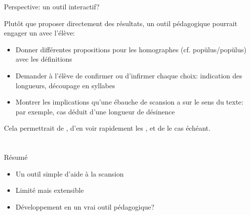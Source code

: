 \documentclass{beamer}
\newcommand\overtxt[2]{\makebox[0cm][l]{\color{diacrit}#1}#2}
\newcommand\hlbr{\overtxt{\u~}}
\newcommand\hllg{\overtxt{\=~}}
\begin{document}
\begin{frame}{Perspective: un outil interactif?}

Plutôt que proposer directement des résultats, un outil pédagogique pourrait engager un  avec l'élève:

\begin{itemize}
\item Donner différentes propositions pour les homographes (cf. p\hlbr{o}p\u{u}lus/p\hllg{o}p\u{u}lus) avec les définitions

\item Demander à l'élève de confirmer ou d'infirmer chaque choix: indication des longueurs, découpage en syllabes

\item Montrer les implications qu'une ébauche de scansion a sur le sens du texte:\\ par exemple, cas déduit d'une longueur de désinence

\end{itemize}

\vfill

Cela permettrait de , d'en voir rapidement les , et de  le cas échéant.

\end{frame} %



\section*{}

\begin{frame}{Résumé}

\begin{itemize}
\item Un outil simple d'aide à la scansion
\item Limité mais extensible
\item Développement en un vrai outil pédagogique?
\end{itemize}

\vfill


\vfill

\end{frame} %
\end{document}
